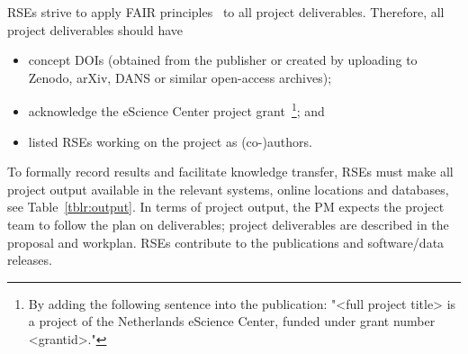 RSEs strive to apply FAIR principles~\cite{fair-principles,FAIR4RS} to all project deliverables. Therefore, all project deliverables should have
\begin{itemize}
\item concept DOIs (obtained from the publisher or created by uploading to Zenodo, arXiv, DANS or similar open-access
archives);
\item acknowledge the eScience Center project grant~\footnote{By adding the following sentence into the publication: "<full project title> is a project of the Netherlands eScience Center, funded under grant number <grantid>."}; and
\item listed RSEs working on the project as (co-)authors.
\end{itemize}

To formally record results and facilitate knowledge transfer, RSEs must make all project output available in the
relevant systems, online locations and databases, see Table~\ref{tblr:output}. In terms of project output, the PM expects the project team to follow the plan on deliverables; project deliverables are
described in the proposal and workplan. RSEs contribute to the publications and software/data releases.


